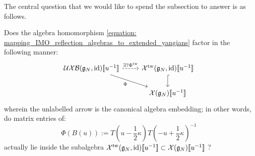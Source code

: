         The central question that we would like to spend the subsection to answer is as follows.
        \begin{question}
            Does the algebra homomorphism \eqref{equation: mapping_IMO_reflection_algebras_to_extended_yangians} factor in the following manner:
                \begin{equation} \label{diagram: mapping_IMO_reflection_algebras_to_extended_twisted_yangians}
                    \begin{tikzcd}
                        {\UXB(\g_N, \id)[\![u^{-1}]\!]} & {\calX^{\tw}(\g_N, \id)[\![u^{-1}]\!]} \\
                        & {\calX(\g_N)[\![u^{-1}]\!]}
                        \arrow["{\exists ? \Phi^{\tw}}", dashed, from=1-1, to=1-2]
                        \arrow["\Phi"', from=1-1, to=2-2]
                        \arrow[hook, from=1-2, to=2-2]
                    \end{tikzcd}
                \end{equation}
            wherein the unlabelled arrow is the canonical algebra embedding; in other words, do matrix entries of:
                $$\Phi(B(u)) := T\left(u - \frac12 \kappa\right) T\left(-u + \frac12 \kappa\right)^{-1}$$
            actually lie inside the subalgebra $\mathcal{X}^{\mathrm{tw}}(\mathfrak{g}_N, \mathrm{id})[\![u^{-1}]\!] \subset \mathcal{X}(\mathfrak{g}_N)[\![u^{-1}]\!]$ ?
        \end{question}
    
